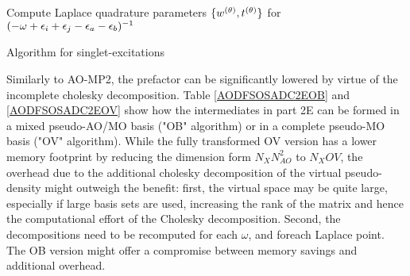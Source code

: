 \begin{algorithm}
Compute Laplace quadrature parameters $\{w^{(\theta)},t^{(\theta)}\}$ for $(-\omega + \epsilon_i + \epsilon_j - \epsilon_a - \epsilon_b)^{-1}$ \\
\caption{Algorithm for singlet-excitations}
\label{AODFSOSADC2E}
\end{algorithm}

Similarly to AO-MP2, the prefactor can be significantly lowered by virtue of the incomplete cholesky decomposition. Table \ref{AODFSOSADC2EOB} and \ref{AODFSOSADC2EOV} show how the intermediates in part 2E can be formed in a mixed pseudo-AO/MO basis ("OB" algorithm) or in a complete pseudo-MO basis ("OV" algorithm). While the fully transformed OV version has a lower memory footprint by reducing the dimension form $N_XN_{AO}^2$ to $N_XOV$, the overhead due to the additional cholesky decomposition of the virtual pseudo-density might outweigh the benefit: first, the virtual space may be quite large, especially if large basis sets are used, increasing the rank of the matrix and hence the computational effort of the Cholesky decomposition. Second, the decompositions need to be recomputed for each $\omega$, and foreach Laplace point. The OB version might offer a compromise between memory savings and additional overhead. 


